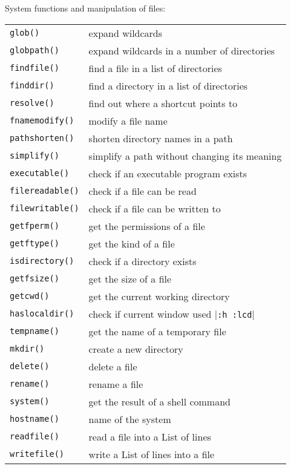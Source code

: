 System functions and manipulation of files:
\label{system-functions}
\label{file-functions}
\begin{center} \begin{tabular}{l l}
				\verb!glob()! & expand wildcards \\
				\verb!globpath()! & expand wildcards in a number of directories \\
				\verb!findfile()! & find a file in a list of directories \\
				\verb!finddir()! & find a directory in a list of directories \\
				\verb!resolve()! & find out where a shortcut points to \\
				\verb!fnamemodify()! & modify a file name \\
				\verb!pathshorten()! & shorten directory names in a path \\
				\verb!simplify()! & simplify a path without changing its meaning \\
				\verb!executable()! & check if an executable program exists \\
				\verb!filereadable()! & check if a file can be read \\
				\verb!filewritable()! & check if a file can be written to \\
				\verb!getfperm()! & get the permissions of a file \\
				\verb!getftype()! & get the kind of a file \\
				\verb!isdirectory()! & check if a directory exists \\
				\verb!getfsize()! & get the size of a file \\
				\verb!getcwd()! & get the current working directory \\
				\verb!haslocaldir()! & check if current window used |\verb!:h :lcd!| \\
				\verb!tempname()! & get the name of a temporary file \\
				\verb!mkdir()! & create a new directory \\
				\verb!delete()! & delete a file \\
				\verb!rename()! & rename a file \\
				\verb!system()! & get the result of a shell command \\
				\verb!hostname()! & name of the system \\
				\verb!readfile()! & read a file into a List of lines \\
				\verb!writefile()! & write a List of lines into a file \\
\end{tabular} \end{center}

